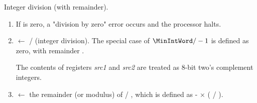 


Integer division (with remainder).
	
\begin{enumerate}

\item If  is zero, a "division by zero" error occurs
	and the processor halts.

\item {} $\leftarrow$  /  (integer division). 
	The special case of $\MinIntWord / -1$ is defined as zero, with
	remainder \MinIntWord.

	The contents of registers {\em src1} and {\em src2} are
	treated as 8-bit two's complement integers.

\item {} $\leftarrow$ the remainder (or modulus)
	of  / ,  which is defined as
	 -  $\times$ ( / ).

\end{enumerate}

